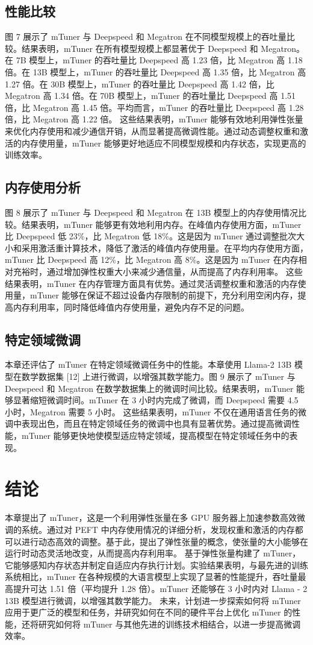 \subsection{性能比较}
图 7 展示了 mTuner 与 Deepspeed 和 Megatron 在不同模型规模上的吞吐量比较。结果表明，mTuner 在所有模型规模上都显著优于 Deepspeed 和 Megatron。在 7B 模型上，mTuner 的吞吐量比 Deepspeed 高 1.23 倍，比 Megatron 高 1.18 倍。在 13B 模型上，mTuner 的吞吐量比 Deepspeed 高 1.35 倍，比 Megatron 高 1.27 倍。在 30B 模型上，mTuner 的吞吐量比 Deepspeed 高 1.42 倍，比 Megatron 高 1.34 倍。在 70B 模型上，mTuner 的吞吐量比 Deepspeed 高 1.51 倍，比 Megatron 高 1.45 倍。平均而言，mTuner 的吞吐量比 Deepspeed 高 1.28 倍，比 Megatron 高 1.22 倍。
这些结果表明，mTuner 能够有效地利用弹性张量来优化内存使用和减少通信开销，从而显著提高微调性能。通过动态调整权重和激活的内存使用量，mTuner 能够更好地适应不同模型规模和内存状态，实现更高的训练效率。
\subsection{内存使用分析}
图 8 展示了 mTuner 与 Deepspeed 和 Megatron 在 13B 模型上的内存使用情况比较。结果表明，mTuner 能够更有效地利用内存。在峰值内存使用方面，mTuner 比 Deepspeed 低 23\%，比 Megatron 低 18\%。这是因为 mTuner 通过调整批次大小和采用激活重计算技术，降低了激活的峰值内存使用量。在平均内存使用方面，mTuner 比 Deepspeed 高 12\%，比 Megatron 高 8\%。这是因为 mTuner 在内存相对充裕时，通过增加弹性权重大小来减少通信量，从而提高了内存利用率。
这些结果表明，mTuner 在内存管理方面具有优势。通过灵活调整权重和激活的内存使用量，mTuner 能够在保证不超过设备内存限制的前提下，充分利用空闲内存，提高内存利用率，同时降低峰值内存使用量，避免内存不足的问题。
\subsection{特定领域微调}
本章还评估了 mTuner 在特定领域微调任务中的性能。本章使用 Llama-2 13B 模型在数学数据集 [12] 上进行微调，以增强其数学能力。图 9 展示了 mTuner 与 Deepspeed 和 Megatron 在数学数据集上的微调时间比较。结果表明，mTuner 能够显著缩短微调时间。mTuner 在 3 小时内完成了微调，而 Deepspeed 需要 4.5 小时，Megatron 需要 5 小时。
这些结果表明，mTuner 不仅在通用语言任务的微调中表现出色，而且在特定领域任务的微调中也具有显著优势。通过提高微调性能，mTuner 能够更快地使模型适应特定领域，提高模型在特定领域任务中的表现。
\section{结论}
本章提出了 mTuner，这是一个利用弹性张量在多 GPU 服务器上加速参数高效微调的系统。通过对 PEFT 中内存使用情况的详细分析，发现权重和激活的内存都可以进行动态高效的调整。基于此，提出了弹性张量的概念，使张量的大小能够在运行时动态灵活地改变，从而提高内存利用率。
基于弹性张量构建了 mTuner，它能够感知内存状态并制定自适应内存执行计划。实验结果表明，与最先进的训练系统相比，mTuner 在各种规模的大语言模型上实现了显著的性能提升，吞吐量最高提升可达 1.51 倍（平均提升 1.28 倍）。mTuner 还能够在 3 小时内对 Llama - 2 13B 模型进行微调，以增强其数学能力。
未来，计划进一步探索如何将 mTuner 应用于更广泛的模型和任务，并研究如何在不同的硬件平台上优化 mTuner 的性能，还将研究如何将 mTuner 与其他先进的训练技术相结合，以进一步提高微调效率。

